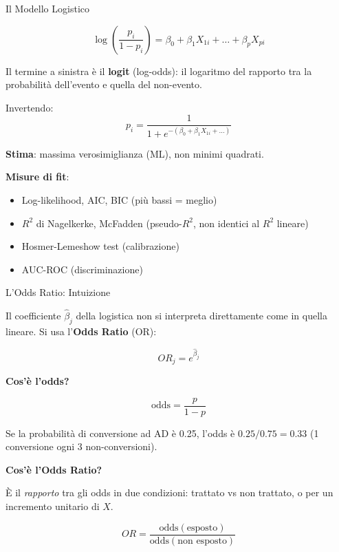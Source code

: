 \documentclass[
  ignorenonframetext,
]{beamer}
\begin{document}
\begin{frame}{Il Modello Logistico}
\label{il-modello-logistico}
\small

\[\log\left(\frac{p_i}{1-p_i}\right) = \beta_0 + \beta_1 X_{1i} + \ldots + \beta_p X_{pi}\]

Il termine a sinistra è il \textbf{logit} (log-odds): il logaritmo del
rapporto tra la probabilità dell'evento e quella del non-evento.

\vspace{0.3em}

Invertendo:
\[p_i = \frac{1}{1 + e^{-(\beta_0 + \beta_1 X_{1i} + \ldots)}}\]

\vspace{0.3em}

\textbf{Stima}: massima verosimiglianza (ML), non minimi quadrati.

\vspace{0.3em}

\textbf{Misure di fit}:

\begin{itemize}\footnotesize
\item Log-likelihood, AIC, BIC (più bassi = meglio)
\item $R^2$ di Nagelkerke, McFadden (pseudo-$R^2$, non identici al $R^2$ lineare)
\item Hosmer-Lemeshow test (calibrazione)
\item AUC-ROC (discriminazione)
\end{itemize}
\end{frame}

\begin{frame}{L'Odds Ratio: Intuizione}
\label{lodds-ratio-intuizione}
\small

Il coefficiente \(\hat{\beta}_j\) della logistica non si interpreta
direttamente come in quella lineare. Si usa l'\textbf{Odds Ratio} (OR):

\[OR_j = e^{\hat{\beta}_j}\]

\vspace{0.3em}

\textbf{Cos'è l'odds?}

\[\text{odds} = \frac{p}{1-p}\]

Se la probabilità di conversione ad AD è 0.25, l'odds è
\(0.25/0.75 = 0.33\) (1 conversione ogni 3 non-conversioni).

\vspace{0.4em}

\textbf{Cos'è l'Odds Ratio?}

È il \emph{rapporto} tra gli odds in due condizioni: trattato vs non
trattato, o per un incremento unitario di \(X\).

\[OR = \frac{\text{odds}(\text{esposto})}{\text{odds}(\text{non esposto})}\]
\end{frame}
\end{document}
